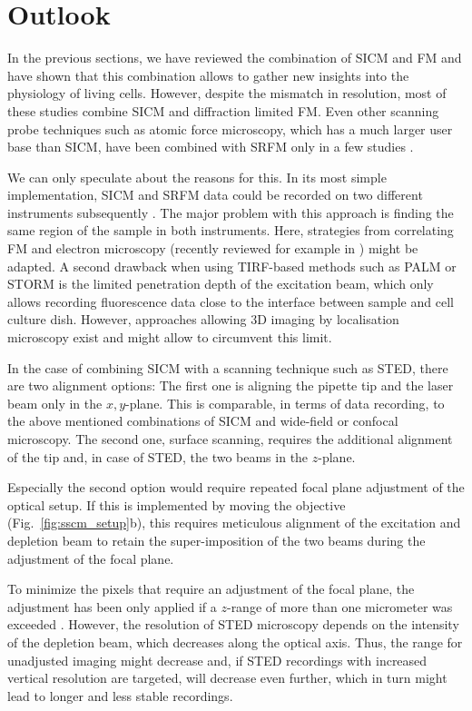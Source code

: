 \section{Outlook}
\label{sec:pitfalls}

In the previous sections, we have reviewed the combination of SICM and FM and
have shown that this combination allows to gather new insights into the
physiology of living cells. However, despite the mismatch in resolution, most
of these studies combine SICM and diffraction limited FM. Even other scanning
probe techniques such as atomic force microscopy, which has a much larger user
base than SICM, have been combined with SRFM only in a few studies
\cite{Harke2012,Chacko2013,Chacko2013b,Odermatt2015,Curry2017,Hirvonen2018}.

We can only speculate about the reasons for this. In its most simple
implementation, SICM and SRFM data could be recorded on two different
instruments subsequently \cite{Hagemann2018}. The major problem with this
approach is finding the same region of the sample in both instruments. Here,
strategies from correlating FM and electron microscopy (recently reviewed for
example in \cite{Begemann2016}) might be adapted. A second drawback when using
TIRF-based methods such as PALM or STORM is the limited penetration depth of
the excitation beam, which only allows recording fluorescence data close to
the interface between sample and cell culture dish. However, approaches
allowing 3D imaging by localisation microscopy exist
\cite{Huang2008a,Huang2008} and might allow to circumvent this limit.  

In the case of combining SICM with a scanning technique such as STED, there
are two alignment options: The first one is aligning the pipette tip and the
laser beam only in the $x,y$-plane. This is comparable, in terms of data
recording, to the above mentioned combinations of SICM and wide-field or
confocal microscopy. The second one, surface scanning, requires the
additional alignment of the tip and, in case of STED, the two beams in the
$z$-plane.

Especially the second option would require repeated
focal plane adjustment of the optical setup. If this is implemented by moving
the objective (Fig.~\ref{fig:sscm_setup}b), this requires meticulous
alignment of the excitation and depletion beam to retain the super-imposition
of the two beams during the adjustment of the focal plane.

To minimize the
pixels that require an adjustment of the focal plane, the adjustment has been
only applied if a $z$-range of more than one micrometer was exceeded
\cite{Novak2014}. However, the resolution of STED microscopy depends on
the intensity of the depletion beam, which decreases along the optical
axis. Thus, the range for unadjusted imaging might decrease and, if STED
recordings with increased vertical resolution are
targeted, will decrease even further,
which in turn might lead to longer and less stable recordings. 

